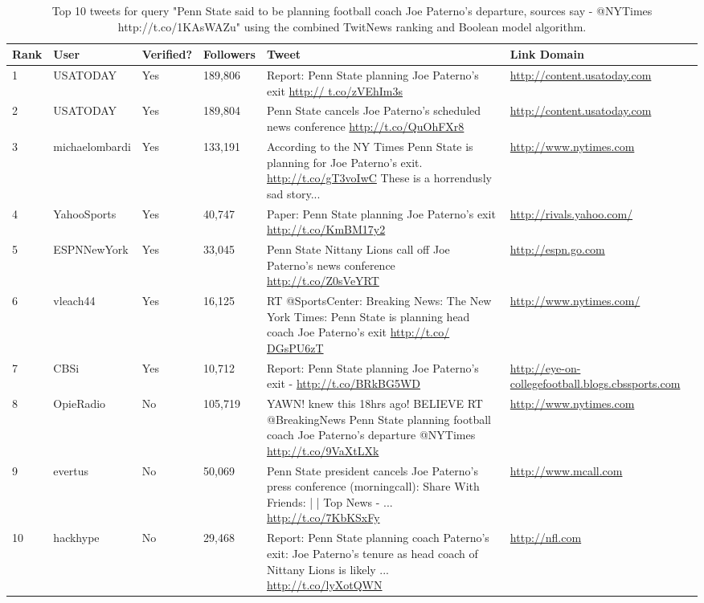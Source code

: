 \documentclass[10pt]{proc}
\begin{document}
  \begin{table*}
    \begin{tabular}{| l | l | l | l | p{6.5cm} | p{2cm} |}
      \hline
      Rank & User & Verified? & Followers & Tweet & Link Domain \\
      \hline
      1 & USATODAY & Yes & 189,806 & Report: Penn State planning Joe Paterno's exit \url{http:// t.co/zVEhIm3s} & \url{http://content.usatoday.com} \\
      \hline
      2 & USATODAY & Yes & 189,804 & Penn State cancels Joe Paterno's scheduled news conference \url{http://t.co/QuOhFXr8} & \url{http://content.usatoday.com} \\
      \hline
      3 & michaelombardi & Yes & 133,191 & According to the NY Times Penn State is planning for Joe Paterno's exit. \url{http://t.co/gT3voIwC} These is a horrendusly sad story... & \url{http://www.nytimes.com} \\
      \hline
      4 & YahooSports & Yes & 40,747 & Paper: Penn State planning Joe Paterno's exit \url{http://t.co/KmBM17y2} & \url{http://rivals.yahoo.com/} \\
      \hline
      5 & ESPNNewYork & Yes & 33,045 & Penn State Nittany Lions call off Joe Paterno's news conference \url{http://t.co/Z0sVeYRT} & \url{http://espn.go.com} \\
      \hline
      6 & vleach44 & Yes & 16,125 & RT @SportsCenter: Breaking News: The New York Times: Penn State is planning head coach Joe Paterno's exit \url{http://t.co/ DGsPU6zT} & \url{http://www.nytimes.com/} \\
      \hline
      7 & CBSi & Yes & 10,712 & Report: Penn State planning Joe Paterno's exit - \url{http://t.co/BRkBG5WD} & \url{http://eye-on-collegefootball.blogs.cbssports.com} \\
      \hline
      8 & OpieRadio & No & 105,719 & YAWN! knew this 18hrs ago! BELIEVE RT @BreakingNews Penn State planning football coach Joe Paterno's departure @NYTimes \url{http://t.co/9VaXtLXk} & \url{http://www.nytimes.com} \\
      \hline
      9 & evertus & No & 50,069 & Penn State president cancels Joe Paterno's press conference (morningcall): Share With Friends: | | Top News - ... \url{http://t.co/7KbKSxFy} & \url{http://www.mcall.com} \\
      \hline
      10 & hackhype & No & 29,468 & Report: Penn State planning coach Paterno's exit: Joe Paterno's tenure as head coach of Nittany Lions is likely ... \url{http://t.co/lyXotQWN} & \url{http://nfl.com} \\
      \hline
    \end{tabular}
    \caption{Top 10 tweets for query "Penn State said to be planning football coach Joe Paterno's departure, sources say - @NYTimes http://t.co/1KAsWAZu" using the combined TwitNews ranking and Boolean model algorithm.}
    \label{PennStateRanking}    
  \end{table*}
\end{document}
